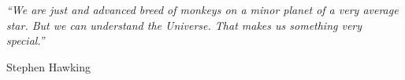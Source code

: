 \documentclass[a4paper, 11pt, oneside]{Thesis}  %
\begin{document}
 
 
 
 
 
 
 

\pagestyle{empty}  %

\null\vfill
\textit{``We are just and advanced breed of monkeys on a minor planet of a very average star. But we can understand the Universe. That makes us something very special.''}

\begin{flushright}
Stephen Hawking
\end{flushright}

\vfill\vfill\vfill\vfill\vfill\vfill\null
\clearpage  %
\end{document}
